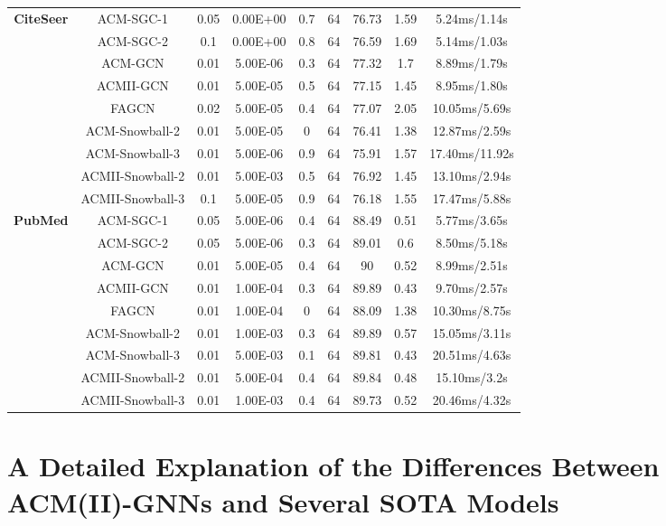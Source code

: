 \documentclass{article}
\newcommand{\0}{{\boldsymbol{0}}}
\newcommand{\6}{{\partial}}
\newcommand{\8}{{\infty}}
\newcommand{\4}{{\nabla}}
\begin{document}
\begin{table}[htbp]
{\begin{tabular}{c|c|ccccccc}
           \midrule
    \multirow{9}[0]{*}{\textbf{CiteSeer}} & ACM-SGC-1 & 0.05  & 0.00E+00 & 0.7   & 64    & 76.73 & 1.59  & 5.24ms/1.14s \\
          & ACM-SGC-2 & 0.1   & 0.00E+00 & 0.8   & 64    & 76.59 & 1.69  & 5.14ms/1.03s \\
          & ACM-GCN & 0.01  & 5.00E-06 & 0.3   & 64    & 77.32 & 1.7   & 8.89ms/1.79s \\
          & ACMII-GCN & 0.01  & 5.00E-05 & 0.5   & 64    & 77.15 & 1.45  & 8.95ms/1.80s \\
          & FAGCN & 0.02  & 5.00E-05 & 0.4   & 64    & 77.07 & 2.05  & 10.05ms/5.69s \\
          & ACM-Snowball-2 & 0.01  & 5.00E-05 & 0     & 64    & 76.41 & 1.38  & 12.87ms/2.59s \\
          & ACM-Snowball-3 & 0.01  & 5.00E-06 & 0.9   & 64    & 75.91 & 1.57  & 17.40ms/11.92s \\
          & ACMII-Snowball-2 & 0.01  & 5.00E-03 & 0.5   & 64    & 76.92 & 1.45  & 13.10ms/2.94s \\
          & ACMII-Snowball-3 & 0.1   & 5.00E-05 & 0.9   & 64    & 76.18 & 1.55  & 17.47ms/5.88s \\
           \midrule
    \multirow{9}[1]{*}{\textbf{PubMed}} & ACM-SGC-1 & 0.05  & 5.00E-06 & 0.4   & 64    & 88.49 & 0.51  & 5.77ms/3.65s \\
          & ACM-SGC-2 & 0.05  & 5.00E-06 & 0.3   & 64    & 89.01 & 0.6   & 8.50ms/5.18s \\
          & ACM-GCN & 0.01  & 5.00E-05 & 0.4   & 64    & 90    & 0.52  & 8.99ms/2.51s \\
          & ACMII-GCN & 0.01  & 1.00E-04 & 0.3   & 64    & 89.89 & 0.43  & 9.70ms/2.57s \\
          & FAGCN & 0.01  & 1.00E-04 & 0     & 64    & 88.09 & 1.38  & 10.30ms/8.75s \\
          & ACM-Snowball-2 & 0.01  & 1.00E-03 & 0.3   & 64    & 89.89 & 0.57  & 15.05ms/3.11s \\
          & ACM-Snowball-3 & 0.01  & 5.00E-03 & 0.1   & 64    & 89.81 & 0.43  & 20.51ms/4.63s \\
          & ACMII-Snowball-2 & 0.01  & 5.00E-04 & 0.4   & 64    & 89.84 & 0.48  & 15.10ms/3.2s \\
          & ACMII-Snowball-3 & 0.01  & 1.00E-03 & 0.4   & 64    & 89.73 & 0.52  & 20.46ms/4.32s \\
    \bottomrule
    \bottomrule
    \end{tabular}}
  \label{tab:optimal_hyperparameters_fixed_splits}\end{table} \section{A Detailed Explanation of the Differences Between ACM(II)-GNNs and Several SOTA Models}
\end{document}
